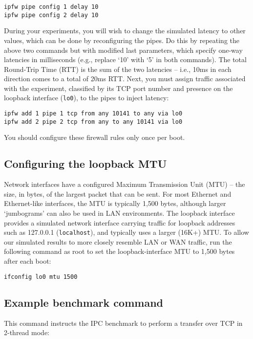 \documentclass[a4paper,10pt]{article}
\begin{document}
\begin{verbatim}
ipfw pipe config 1 delay 10
ipfw pipe config 2 delay 10
\end{verbatim}

\noindent
During your experiments, you will wish to change the simulated latency to
other values, which can be done by reconfiguring the pipes.
Do this by repeating the above two commands but with modified last parameters,
which specify one-way latencies in milliseconds (e.g., replace `10' with `5'
in both commands).
The total Round-Trip Time (RTT) is the sum of the two latencies -- i.e., 10ms
in each direction comes to a total of 20ms RTT.
Next, you must assign traffic associated with the experiment, classified by
its TCP port number and presence on the loopback interface (\texttt{lo0}), to
the pipes to inject latency:

\begin{verbatim}
ipfw add 1 pipe 1 tcp from any 10141 to any via lo0
ipfw add 2 pipe 2 tcp from any to any 10141 via lo0
\end{verbatim}

\noindent
You should configure these firewall rules only once per boot.

\subsection*{Configuring the loopback MTU}

Network interfaces have a configured Maximum Transmission Unit (MTU) -- the
size, in bytes, of the largest packet that can be sent.
For most Ethernet and Ethernet-like interfaces, the MTU is typically 1,500
bytes, although larger `jumbograms' can also be used in LAN environments.
The loopback interface provides a simulated network interface carrying
traffic for loopback addresses such as 127.0.0.1 (\texttt{localhost}), and
typically uses a larger (16K+) MTU.
To allow our simulated results to more closely resemble LAN or WAN traffic,
run the following command as root to set the loopback-interface MTU to 1,500
bytes after each boot:

\begin{verbatim}
ifconfig lo0 mtu 1500
\end{verbatim}

\subsection*{Example benchmark command}

This command instructs the IPC benchmark to perform a transfer over TCP in
2-thread mode:
\end{document}
